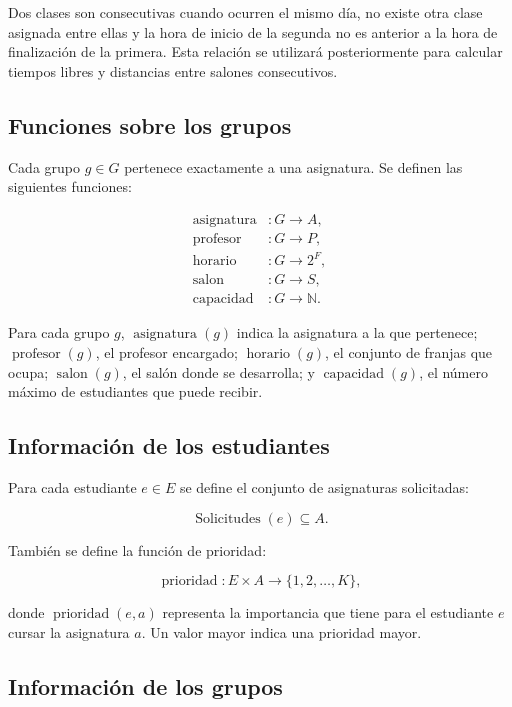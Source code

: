 \documentclass[11pt]{article}
\numberwithin{equation}{section}
\numberwithin{figure}{section}
\numberwithin{table}{section}
\theoremstyle{definition}
\begin{document}
Dos clases son consecutivas cuando ocurren el mismo día, no existe otra clase
asignada entre ellas y la hora de inicio de la segunda no es anterior a la
hora de finalización de la primera. Esta relación se utilizará posteriormente
para calcular tiempos libres y distancias entre salones consecutivos.

\subsection{Funciones sobre los grupos}

Cada grupo $g\in G$ pertenece exactamente a una asignatura. Se definen las
siguientes funciones:

\[
\begin{aligned}
  \operatorname{asignatura} &: G \rightarrow A,\\
  \operatorname{profesor}   &: G \rightarrow P,\\
  \operatorname{horario}    &: G \rightarrow 2^F,\\
  \operatorname{salon}      &: G \rightarrow S,\\
  \operatorname{capacidad}  &: G \rightarrow \mathbb{N}.
\end{aligned}
\]

Para cada grupo $g$, $\operatorname{asignatura}(g)$ indica la asignatura a la
que pertenece; $\operatorname{profesor}(g)$, el profesor encargado;
$\operatorname{horario}(g)$, el conjunto de franjas que ocupa;
$\operatorname{salon}(g)$, el salón donde se desarrolla; y
$\operatorname{capacidad}(g)$, el número máximo de estudiantes que puede
recibir.

\subsection{Información de los estudiantes}

Para cada estudiante $e\in E$ se define el conjunto de asignaturas solicitadas:

\[
\operatorname{Solicitudes}(e)\subseteq A.
\]

También se define la función de prioridad:

\[
\operatorname{prioridad}:E\times A\rightarrow\{1,2,\ldots,K\},
\]

donde $\operatorname{prioridad}(e,a)$ representa la importancia que tiene para
el estudiante $e$ cursar la asignatura $a$. Un valor mayor indica una prioridad
mayor.

\subsection{Información de los grupos}
\end{document}
